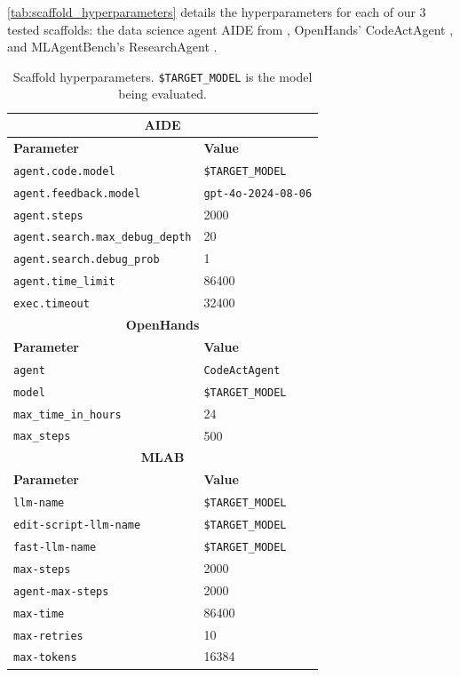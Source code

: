 \documentclass{article} %
\begin{document}
\autoref{tab:scaffold_hyperparameters} details the hyperparameters for each of our 3 tested scaffolds: the data science agent AIDE from \cite{wecoai_wecoaiaideml_2024}, OpenHands' CodeActAgent \citep{all-hands-ai_all-hands-aiopenhands_2024}, and MLAgentBench's ResearchAgent \citep{huang_mlagentbench_2024}.

\begin{table}[h]
\caption{Scaffold hyperparameters. \texttt{\$TARGET\_MODEL} is the model being evaluated.}
\centering
\begin{tabular}{l l}
\toprule
\multicolumn{2}{c}{\textbf{AIDE}} \\
\midrule
\textbf{Parameter}                     & \textbf{Value}                  \\
\midrule
\texttt{agent.code.model}              & \texttt{\$TARGET\_MODEL}      \\
\texttt{agent.feedback.model}\footnotemark      & \texttt{gpt-4o-2024-08-06}     \\
\texttt{agent.steps}                   & 2000                            \\
\texttt{agent.search.max\_debug\_depth} & 20                              \\
\texttt{agent.search.debug\_prob}      & 1                               \\
\texttt{agent.time\_limit}             & 86400                \\
\texttt{exec.timeout}                  & 32400                 \\
\midrule
\multicolumn{2}{c}{\textbf{OpenHands}} \\
\midrule
\textbf{Parameter}       & \textbf{Value}                  \\
\midrule
\texttt{agent}           & \texttt{CodeActAgent}           \\
\texttt{model}           & \texttt{\$TARGET\_MODEL}                 \\
\texttt{max\_time\_in\_hours} & 24                         \\
\texttt{max\_steps}      & 500                             \\
\midrule
\multicolumn{2}{c}{\textbf{MLAB}} \\
\midrule
\textbf{Parameter}       & \textbf{Value}                  \\
\midrule
\texttt{llm-name}        & \texttt{\$TARGET\_MODEL}      \\
\texttt{edit-script-llm-name} & \texttt{\$TARGET\_MODEL} \\
\texttt{fast-llm-name}   & \texttt{\$TARGET\_MODEL}      \\
\texttt{max-steps}       & 2000                            \\
\texttt{agent-max-steps} & 2000                            \\
\texttt{max-time}        & 86400                           \\
\texttt{max-retries}     & 10                              \\
\texttt{max-tokens}      & 16384                           \\
\bottomrule
\end{tabular}
\label{tab:scaffold_hyperparameters}
\end{table}
\end{document}
